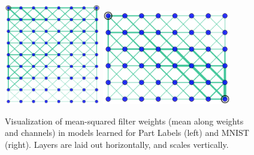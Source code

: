 \documentclass[a4paper,twocolumn]{article}
\begin{document}
\begin{figure}[t]
    \centering
    \includegraphics[width=0.375\textwidth]{fabrics2.png}
    \hskip 1cm 
    \includegraphics[width=0.5\textwidth]{fabrics3.png}
    \caption{Visualization of mean-squared filter weights (mean along weights and channels) in models learned for Part Labels (left) and MNIST (right). Layers are laid out horizontally, and scales vertically.}
\end{figure}
\end{document}
